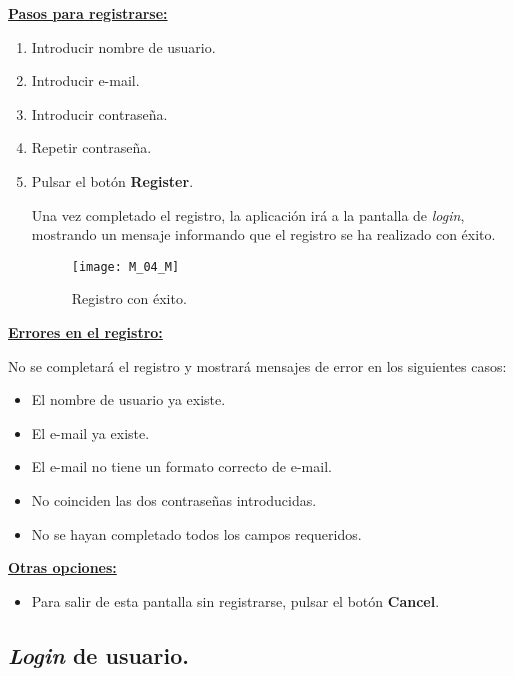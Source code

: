 \textbf{\underline{Pasos para registrarse:} }

\begin{enumerate}

\item Introducir nombre de usuario.
\item Introducir e-mail.
\item Introducir contraseña.
\item Repetir contraseña.
\item Pulsar el botón \textbf{Register}.

Una vez completado el registro, la aplicación irá a la pantalla de \emph{login}, mostrando un mensaje informando que el registro se ha realizado con éxito.

\begin{figure}[H]
	\centering
	\texttt{[image: M\_04\_M]}
	\caption{Registro con éxito.}
	\label{fig:M_04_M}
\end{figure}

\end{enumerate}
\newpage

\textbf{\underline{Errores en el registro:} }



No se completará el registro y mostrará mensajes de error en los siguientes casos:

\begin{itemize}
\item El nombre de usuario ya existe.
\item El e-mail ya existe.
\item El e-mail no tiene un formato correcto de e-mail.
\item No coinciden las dos contraseñas introducidas.
\item No se hayan completado todos los campos requeridos.

\end{itemize}

\textbf{\underline{Otras opciones:} }
\begin{itemize}
\item Para salir de esta pantalla sin registrarse, pulsar el botón \textbf{Cancel}.
\end{itemize}

\subsection{\emph{Login} de usuario.}



